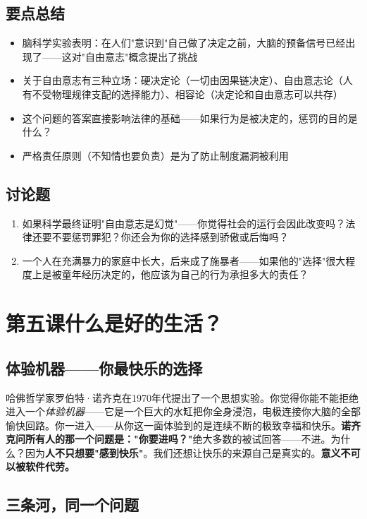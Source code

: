 \documentclass[a4paper,12pt]{ctexart}
\begin{document}
\subsection*{要点总结}
\begin{itemize}
  \item 脑科学实验表明：在人们"意识到"自己做了决定之前，大脑的预备信号已经出现了——这对"自由意志"概念提出了挑战
  \item 关于自由意志有三种立场：硬决定论（一切由因果链决定）、自由意志论（人有不受物理规律支配的选择能力）、相容论（决定论和自由意志可以共存）
  \item 这个问题的答案直接影响法律的基础——如果行为是被决定的，惩罚的目的是什么？
  \item 严格责任原则（不知情也要负责）是为了防止制度漏洞被利用
\end{itemize}

\subsection*{讨论题}
\begin{enumerate}
  \item 如果科学最终证明"自由意志是幻觉"——你觉得社会的运行会因此改变吗？法律还要不要惩罚罪犯？你还会为你的选择感到骄傲或后悔吗？
  \item 一个人在充满暴力的家庭中长大，后来成了施暴者——如果他的"选择"很大程度上是被童年经历决定的，他应该为自己的行为承担多大的责任？
\end{enumerate}

\newpage
\section{\textcolor{orange!80!black}{第五课\quad 什么是好的生活？}}

\subsection*{体验机器——你最快乐的选择}

哈佛哲学家罗伯特·诺齐克在1970年代提出了一个思想实验。你觉得你能不能拒绝进入一个\textit{体验机器}——它是一个巨大的水缸把你全身浸泡，电极连接你大脑的全部愉快回路。你一进入——从你这一面体验到的是连续不断的极致幸福和快乐。\textbf{诺齐克问所有人的那一个问题是："你要进吗？"}绝大多数的被试回答——不进。为什么？因为\textbf{人不只想要"感到快乐"}。我们还想让快乐的来源自己是真实的。\textbf{意义不可以被软件代劳。}

\subsection*{三条河，同一个问题}
\end{document}
